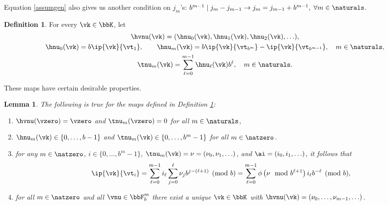 \documentclass[]{elsarticle}
\newtheorem{lem}{Lemma}
\theoremstyle{definition}
\newtheorem{defin}{Definition}
\begin{document}
Equation \eqref{assumgen} also gives us another condition on $j_m$'s: $ b^{m-1} \mid j_m-j_{m-1}\rightarrow j_m=j_{m-1}+b^{m-1},\;\forall m\in\naturals$.

\begin{defin} \label{numapdef} For every $\vk \in \bbK$, let
\begin{subequations} \label{numapdefeq}
\begin{gather}
\hvnu(\vk)=(\hnu_0(\vk), \hnu_1(\vk), \hnu_2(\vk), \ldots ), \\
\hnu_0(\vk) = b\ip{\vk}{\vt_{1}}, \qquad \hnu_m(\vk)=b\ip{\vk}{\vt_{b^m}}-\ip{\vk}{\vt_{b^{m-1}}}, \quad m \in \naturals, \\
\tnu_m(\vk) = \sum_{\ell=0}^{m-1} \hnu_{\ell}(\vk) b^{\ell}, \quad m \in \naturals.
\end{gather}
\end{subequations}
\end{defin}

These maps have certain desirable properties.

\begin{lem} \label{numaplem} The following is true for the maps defined in Definition \ref{numapdef}:
\begin{enumerate}
\renewcommand{\labelenumi}{\alph{enumi})}

\item $\hvnu(\vzero)=\vzero$ and $\tnu_m(\vzero) = 0$ for all $m \in \naturals$,

\item $\hnu_m(\vk)\in \{0,\dots,b-1\}$ and $\tnu_m(\vk)\in \{0,\dots,b^m-1\}$ for all $m\in\natzero$.

\item for any $m \in \natzero$, $i \in \{0, \ldots, b^m-1\}$,  $\tnu_m(\vk)=\nu=(\nu_0, \nu_1, \ldots)$, and $\ai=(i_0, i_1, \ldots)$, it follows that
\begin{equation} \label{nuwisum}
\ip{\vk}{\vt_i} = \sum_{\ell=0}^{m-1} i_\ell \sum_{j=0}^{\ell} \nu_jb^{j-(\ell+1)} \pmod b = \sum_{\ell=0}^{m-1} \phi\left(\nu \mod b^{\ell+1}\right) i_{\ell}b^{-\ell} \pmod b,
\end{equation}

\item for all $m\in \natzero$ and all $\vnu \in \bbF_b^{m}$ there exist a unique $\vk \in \bbK$ with $\hvnu(\vk)=(\nu_0, \ldots, \nu_{m-1}, \ldots)$.

\end{enumerate}
\end{lem}
\end{document}
